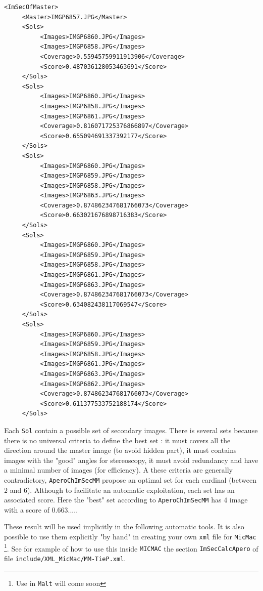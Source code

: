 {\small
\begin{verbatim}
<ImSecOfMaster>
     <Master>IMGP6857.JPG</Master>
     <Sols>
          <Images>IMGP6860.JPG</Images>
          <Images>IMGP6858.JPG</Images>
          <Coverage>0.55945759911913906</Coverage>
          <Score>0.487036128053463691</Score>
     </Sols>
     <Sols>
          <Images>IMGP6860.JPG</Images>
          <Images>IMGP6858.JPG</Images>
          <Images>IMGP6861.JPG</Images>
          <Coverage>0.816071725376866897</Coverage>
          <Score>0.655094691337392177</Score>
     </Sols>
     <Sols>
          <Images>IMGP6860.JPG</Images>
          <Images>IMGP6859.JPG</Images>
          <Images>IMGP6858.JPG</Images>
          <Images>IMGP6863.JPG</Images>
          <Coverage>0.874862347681766073</Coverage>
          <Score>0.663021676898716383</Score>
     </Sols>
     <Sols>
          <Images>IMGP6860.JPG</Images>
          <Images>IMGP6859.JPG</Images>
          <Images>IMGP6858.JPG</Images>
          <Images>IMGP6861.JPG</Images>
          <Images>IMGP6863.JPG</Images>
          <Coverage>0.874862347681766073</Coverage>
          <Score>0.634082438117069547</Score>
     </Sols>
     <Sols>
          <Images>IMGP6860.JPG</Images>
          <Images>IMGP6859.JPG</Images>
          <Images>IMGP6858.JPG</Images>
          <Images>IMGP6861.JPG</Images>
          <Images>IMGP6863.JPG</Images>
          <Images>IMGP6862.JPG</Images>
          <Coverage>0.874862347681766073</Coverage>
          <Score>0.611377533752188174</Score>
     </Sols>
\end{verbatim}
}

Each {\tt Sol} contain a possible set of secondary images. There is several sets because there is no universal
criteria to define the best set : it must covers  all the direction around the master image
(to avoid hidden part), it must contains images with the "good" angles for stereoscopy, it
must avoid redundancy and have a minimal number of images (for efficiency). A these criteria
are generally contradictory, {\tt AperoChImSecMM} propose an optimal set for each cardinal
(between $2$ and $6$). Although to facilitate an automatic exploitation, each set has an
associated score. Here the "best" set according to {\tt AperoChImSecMM} has $4$ image with
a score of $0.663....$.

These result will be used implicitly in the following automatic tools. It is also possible to use them explicitly
"by hand" in creating your own {\tt xml} file for {\tt MicMac} \footnote{Use in {\tt Malt} will come soon}. 
See for example of how to use this inside {\tt MICMAC} the section {\tt ImSecCalcApero} of file 
{\tt include/XML\_MicMac/MM-TieP.xml}.


